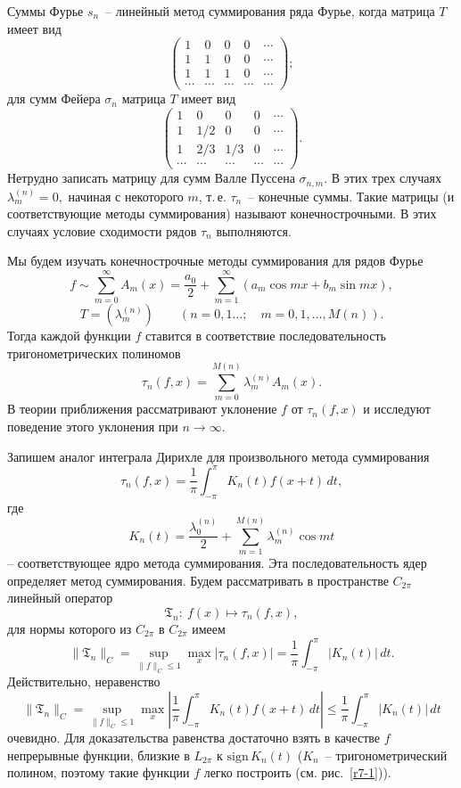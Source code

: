 Суммы Фурье $s_n$~-- линейный метод суммирования ряда Фурье, когда матрица $T$ имеет вид
$$
\left(
\begin{array}{ccccc}
1 & 0 & 0 & 0 & \cdots \\
1 & 1 & 0 & 0 & \cdots \\
1 & 1 & 1 & 0 & \cdots \\
\cdots & \cdots & \cdots & \cdots & \cdots
\end{array}
\right);
$$
для сумм Фейера $\sigma_n$  матрица $T$ имеет вид
$$
\left(
\begin{array}{ccccc}
1 & 0 & 0 & 0 & \cdots \\
1 & {1}/{2} & 0 & 0 & \cdots \\
1 & {2}/{3} & {1}/{3} & 0 & \cdots \\
\cdots & \cdots & \cdots & \cdots & \cdots
\end{array}
\right) .
$$
Нетрудно записать матрицу для сумм Валле Пуссена $\sigma_{n,m}.$ В этих трех случаях
$\lambda_m^{(n)}=0,$ начиная с некоторого $m$, т.\,е. $\tau_n$~-- конечные суммы. Такие
матрицы (и соответствующие методы суммирования) называют конечнострочными. В этих
случаях условие сходимости рядов $\tau_n$ выполняются.

Мы будем изучать конечнострочные методы суммирования для рядов Фурье
$$
f\sim \sum\limits_{m=0}^{\infty} A_m(x)=\frac{a_0}{2}+\sum\limits_{m=1}^{\infty}
{(a_m\cos mx+b_m\sin mx)},
$$
$$
T=(\lambda_m^{(n)}) \qquad (n=0,1\ldots;\quad m=0,1,\ldots, M(n)).
$$
Тогда каждой функции $f$ ставится в соответствие последовательность
тригонометрических полиномов
$$
\tau_n(f,x)=\sum\limits_{m=0}^{M(n)} \lambda_m^{(n)} A_m(x).
$$
В теории приближения рассматривают уклонение $f$ от $\tau_n(f,x)$ и исследуют
поведение этого уклонения при $n\to \infty.$

Запишем аналог интеграла Дирихле для произвольного метода суммирования
$$
\tau_n(f,x)=\frac{1}{\pi} \int_{-\pi}^{\pi} K_n(t) f(x+t)\, dt,
$$
где
$$
K_n(t)=\frac{\lambda_0^{(n)}}{2}+\sum\limits_{m=1}^{M(n)} \lambda_m^{(n)}
\cos mt
$$
-- соответствующее ядро метода суммирования. Эта последовательность ядер определяет
метод суммирования. Будем рассматривать в пространстве
$C_{2\pi}$ линейный оператор
$$
{\mathfrak{T}}_n:\ f(x)\longmapsto \tau_n(f,x),
$$
для нормы которого из {$C_{2\pi}$} в {$C_{2\pi}$} имеем
$$
\|{\mathfrak{T}}_n\|_C=\sup_{\|f\|_C\le 1} \max_x
|{\tau}_n(f,x)|=\frac{1}{\pi}\int_{-\pi}^{\pi} |K_n(t)|\, dt.
$$
Действительно, неравенство
$$
\|{\mathfrak{T}}_n\|_C=\sup_{\|f\|_C\le 1} \max_x
\left| \frac{1}{\pi} \int_{-\pi}^{\pi} K_n(t) f(x+t)\, dt\right|
\le  \frac{1}{\pi} \int_{-\pi}^{\pi} |K_n(t)|\, dt
$$
очевидно. Для доказательства равенства достаточно взять в качестве $f$ непрерывные функции, близкие
в $L_{2\pi}$ к $\mathrm{sign}\,K_n(t)$ ($K_n$~--
тригонометрический полином, поэтому такие функции $f$ легко построить (см. рис.~\ref{r7-1})).

